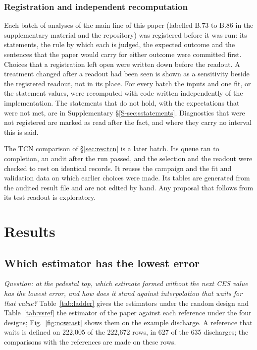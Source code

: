 \documentclass[11pt,a4paper]{article}
\newcommand{\Supp}[1]{Supplementary \S\ref{S-#1}}
\begin{document}
\subsubsection{Registration and independent recomputation}
\label{sec:methods:reg}

Each batch of analyses of the main line of this paper (labelled B.73 to B.86 in the supplementary material and the repository) was registered before it was run: its statements, the rule by which each is judged, the expected outcome and the sentences that the paper would carry for either outcome were committed first. Choices that a registration left open were written down before the readout. A treatment changed after a readout had been seen is shown as a sensitivity beside the registered readout, not in its place. For every batch the inputs and one fit, or the statement values, were recomputed with code written independently of the implementation. The statements that do not hold, with the expectations that were not met, are in \Supp{sec:sstatements}. Diagnostics that were not registered are marked as read after the fact, and where they carry no interval this is said.

The TCN comparison of \S\ref{sec:res:tcn} is a later batch. Its queue ran to completion, an audit after the run passed, and the selection and the readout were checked to rest on identical records. It reuses the campaign and the fit and validation data on which earlier choices were made. Its tables are generated from the audited result file and are not edited by hand. Any proposal that follows from its test readout is exploratory.

\section{Results}
\label{sec:results}

\subsection{Which estimator has the lowest error}
\label{sec:res:best}

\emph{Question: at the pedestal top, which estimate formed without the next CES value has the lowest error, and how does it stand against interpolation that waits for that value?} Table~\ref{tab:ladder} gives the estimators under the random design and Table~\ref{tab:vsref} the estimator of the paper against each reference under the four designs; Fig.~\ref{fig:nowcast} shows them on the example discharge. A reference that waits is defined on 222{,}005 of the 222{,}672 rows, in 627 of the 635 discharges; the comparisons with the references are made on these rows.
\end{document}
